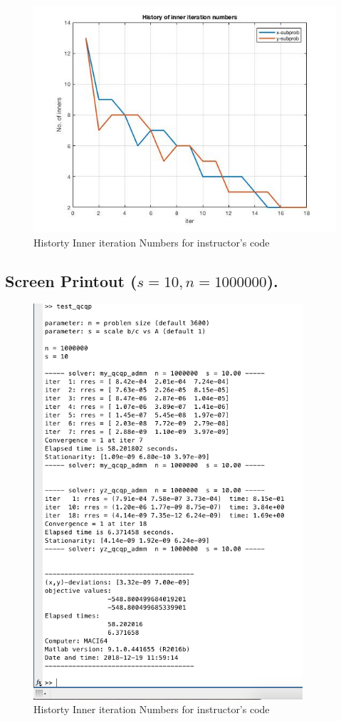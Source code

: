\begin{figure}[H]
\centering
\includegraphics[width=12cm]{F_13/F_1_4.jpg}
\caption{Historty Inner iteration Numbers for instructor's code}
\end{figure}
\subsection{Screen Printout ($s=10,n=1000000$).}
\begin{figure}[H]
\centering
\includegraphics[width=10cm]{F_13/F_1_1.png}
\caption{Historty Inner iteration Numbers for instructor's code}
\end{figure}







